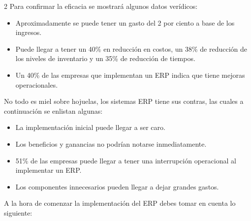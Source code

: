 \documentclass[12pt,spanish,Letterpaper,openany]{book}
\begin{document}
\begin {multicols}{2}
Para confirmar la eficacia se mostrará algunos datos verídicos:

\begin{itemize}
\item
  Aproximadamente se puede tener un gasto del 2 por ciento a base de los ingresos.
\item
  Puede llegar a tener un 40\% en reducción en costos, un 38\% de reducción de los
  niveles de inventario y un 35\% de reducción de tiempos.
\item
  Un 40\% de las empresas que implementan un ERP indica que tiene mejoras
  operacionales.
\end{itemize}

No todo es miel sobre hojuelas, los sistemas ERP tiene sus contras, las cuales a continuación
se enlistan algunas:

\begin{itemize}
\item
  La implementación inicial puede llegar a ser caro.
\item
  Los beneficios y ganancias no podrían notarse inmediatamente.
\item
  51\% de las empresas puede llegar a tener una interrupción operacional al implementar
  un ERP.
\item
  Los componentes innecesarios pueden llegar a dejar grandes gastos.
\end{itemize}

A la hora de comenzar la implementación del ERP debes tomar en cuenta lo siguiente:


\end{multicols}
\end{document}

